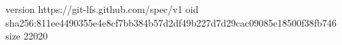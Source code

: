 version https://git-lfs.github.com/spec/v1
oid sha256:811ee4490355e4e8cf7bb384b57d2df49b227d7d29cac09085e18500f38fb746
size 22020
